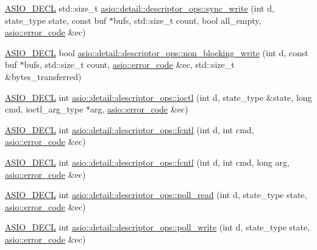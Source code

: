 \begin{DoxyCompactItemize}
\item 
\hyperlink{config_8hpp_ab54d01ea04afeb9a8b39cfac467656b7}{A\+S\+I\+O\+\_\+\+D\+E\+C\+L} std\+::size\+\_\+t \hyperlink{namespaceasio_1_1detail_1_1descriptor__ops_adfa229766b01ecb438e199e3f69f386a}{asio\+::detail\+::descriptor\+\_\+ops\+::sync\+\_\+write} (int d, state\+\_\+type state, const buf $\ast$bufs, std\+::size\+\_\+t count, bool all\+\_\+empty, \hyperlink{classasio_1_1error__code}{asio\+::error\+\_\+code} \&ec)
\item 
\hyperlink{config_8hpp_ab54d01ea04afeb9a8b39cfac467656b7}{A\+S\+I\+O\+\_\+\+D\+E\+C\+L} bool \hyperlink{namespaceasio_1_1detail_1_1descriptor__ops_aad77004eb99a79b6cd448ce6d1482ad9}{asio\+::detail\+::descriptor\+\_\+ops\+::non\+\_\+blocking\+\_\+write} (int d, const buf $\ast$bufs, std\+::size\+\_\+t count, \hyperlink{classasio_1_1error__code}{asio\+::error\+\_\+code} \&ec, std\+::size\+\_\+t \&bytes\+\_\+transferred)
\item 
\hyperlink{config_8hpp_ab54d01ea04afeb9a8b39cfac467656b7}{A\+S\+I\+O\+\_\+\+D\+E\+C\+L} int \hyperlink{namespaceasio_1_1detail_1_1descriptor__ops_afed8890fa05f9b932b50dcff81d5b659}{asio\+::detail\+::descriptor\+\_\+ops\+::ioctl} (int d, state\+\_\+type \&state, long cmd, ioctl\+\_\+arg\+\_\+type $\ast$arg, \hyperlink{classasio_1_1error__code}{asio\+::error\+\_\+code} \&ec)
\item 
\hyperlink{config_8hpp_ab54d01ea04afeb9a8b39cfac467656b7}{A\+S\+I\+O\+\_\+\+D\+E\+C\+L} int \hyperlink{namespaceasio_1_1detail_1_1descriptor__ops_a50ecc1bb18d53d214abfeca6ceb9bc4f}{asio\+::detail\+::descriptor\+\_\+ops\+::fcntl} (int d, int cmd, \hyperlink{classasio_1_1error__code}{asio\+::error\+\_\+code} \&ec)
\item 
\hyperlink{config_8hpp_ab54d01ea04afeb9a8b39cfac467656b7}{A\+S\+I\+O\+\_\+\+D\+E\+C\+L} int \hyperlink{namespaceasio_1_1detail_1_1descriptor__ops_a2db735e0f86e600494183bcabbc3d5b1}{asio\+::detail\+::descriptor\+\_\+ops\+::fcntl} (int d, int cmd, long arg, \hyperlink{classasio_1_1error__code}{asio\+::error\+\_\+code} \&ec)
\item 
\hyperlink{config_8hpp_ab54d01ea04afeb9a8b39cfac467656b7}{A\+S\+I\+O\+\_\+\+D\+E\+C\+L} int \hyperlink{namespaceasio_1_1detail_1_1descriptor__ops_a3df8d319a2df8be7039a62bfb59686db}{asio\+::detail\+::descriptor\+\_\+ops\+::poll\+\_\+read} (int d, state\+\_\+type state, \hyperlink{classasio_1_1error__code}{asio\+::error\+\_\+code} \&ec)
\item 
\hyperlink{config_8hpp_ab54d01ea04afeb9a8b39cfac467656b7}{A\+S\+I\+O\+\_\+\+D\+E\+C\+L} int \hyperlink{namespaceasio_1_1detail_1_1descriptor__ops_ab3ae5ba1bb1f565b3c62137fe56a3dbd}{asio\+::detail\+::descriptor\+\_\+ops\+::poll\+\_\+write} (int d, state\+\_\+type state, \hyperlink{classasio_1_1error__code}{asio\+::error\+\_\+code} \&ec)
\end{DoxyCompactItemize}


